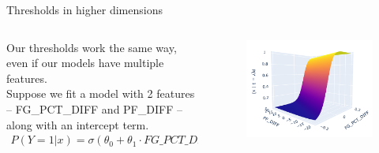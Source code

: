 \documentclass[aspectratio=169]{../latex_main/tntbeamer}  %
\begin{document}
	
	\begin{frame}{Thresholds in higher dimensions}
	    \begin{columns}
	        \begin{column}{.7\textwidth}
	                Our thresholds work the same way, even if our models have multiple features.\\
	                \bigskip
	                Suppose we fit a model with 2 features – FG\_PCT\_DIFF and PF\_DIFF – along with an intercept term.
	                \begin{align*}
	                    P(Y=1|x) = \sigma (\theta_0  + \theta_1 \cdot FG\_PCT\_DIFF + \theta_2 \cdot PF\_DIFF)
	                \end{align*}
	        \end{column}
	        
	        
	        \begin{column}{.4\textwidth}
	                \begin{figure}
	                    \centering
	                    \includegraphics[scale=.5]{Bild4}
	                \end{figure}
	        \end{column}
	    \end{columns}
	\end{frame}
	
\end{document}
